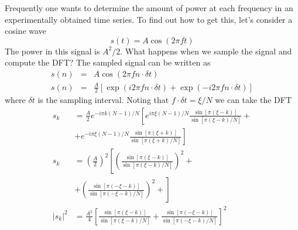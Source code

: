 
Frequently one wants to determine the amount of power at each frequency
in an experimentally obtained time series. To find out how to get
this, let's consider a cosine wave\[
s(t)=A\cos\left(2\pi ft\right)\]
 The power in this signal is $A^{2}/2$. What happens when we sample
the signal and compute the DFT? The sampled signal can be written
as\begin{eqnarray*}
s(n) & = & A\cos\left(2\pi fn\cdot\delta t\right)\\
s(n) & = & \frac{A}{2}\left[\exp\left(i2\pi fn\cdot\delta t\right)+\exp\left(-i2\pi fn\cdot\delta t\right)\right]\end{eqnarray*}
 where $\delta t$ is the sampling interval. Noting that $f\cdot\delta t=\xi/N$
we can take the DFT\begin{align*}
s_{k} & = \frac{A}{2}e^{-i\pi k(N-1)/N}\left[e^{i\pi\xi(N-1)/N}\frac{\sin\left[\pi\left(\xi-k\right)\right]}{\sin\left[\pi\left(\xi-k\right)/N\right]}+\right.\\
 & + \left.e^{-i\pi\xi(N-1)/N}\frac{\sin\left[\pi\left(\xi+k\right)\right]}{\sin\left[\pi\left(\xi+k\right)/N\right]}\right]\\
s_{k} & = \left(\frac{A}{2}\right)^{2}\left[\left(\frac{\sin\left[\pi\left(\xi-k\right)\right]}{\sin\left[\pi\left(\xi-k\right)/N\right]}\right)^{2}+\right.\\
 & + \left.\left(\frac{\sin\left[\pi\left(-\xi-k\right)\right]}{\sin\left[\pi\left(-\xi-k\right)/N\right]}\right)^{2}+\right]\\
|s_{k}|^{2} & = \frac{A^{2}}{4}\left[\frac{\sin\left[\pi\left(\xi-k\right)\right]}{\sin\left[\pi\left(\xi-k\right)/N\right]}+\frac{\sin\left[\pi\left(-\xi-k\right)\right]}{\sin\left[\pi\left(-\xi-k\right)/N\right]}\right]^{2}
\end{align*}



